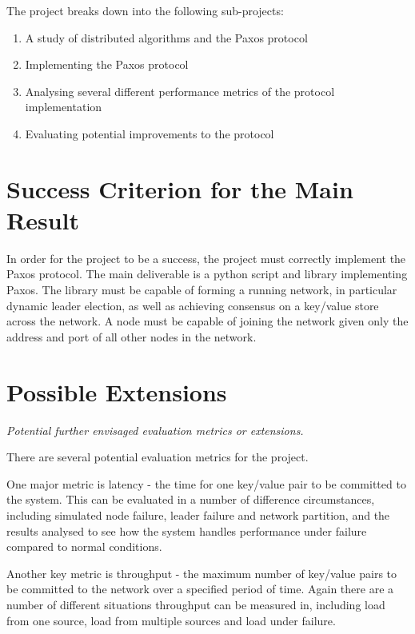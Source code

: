 The project breaks down into the following sub-projects:

\begin{enumerate}

\item A study of distributed algorithms and the Paxos protocol

\item Implementing the Paxos protocol

\item Analysing several different performance metrics of the protocol implementation

\item Evaluating potential improvements to the protocol

\end{enumerate}

\section*{Success Criterion for the Main Result}

In order for the project to be a success, the project must correctly implement the Paxos protocol.
The main deliverable is a python script and library implementing Paxos. The library must be
capable of forming a running network, in particular dynamic leader election, as well as achieving
consensus on a key/value store across the network. A node must be capable of joining the network
given only the address and port of all other nodes in the network.


\section*{Possible Extensions}

{\em Potential further envisaged evaluation metrics or extensions.}

There are several potential evaluation metrics for the project.

One major metric is latency - the time for one key/value pair to be committed to the system. This
can be evaluated in a number of difference circumstances, including simulated node failure, leader
failure and network partition, and the results analysed to see how the system handles performance
under failure compared to normal conditions.

Another key metric is throughput - the maximum number of key/value pairs to be committed to the
network over a specified period of time. Again there are a number of different situations
throughput can be measured in, including load from one source, load from multiple sources and
load under failure.

